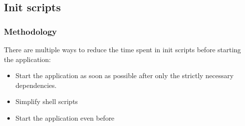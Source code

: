 \subsection{Init scripts}
\begin{frame}
\frametitle{Methodology}
There are multiple ways to reduce the time spent in init scripts before
starting the application:
\begin{itemize}
	\item Start the application as soon as possible after only the
              strictly necessary dependencies.
  	\item Simplify shell scripts
	\item Start the application even before 
\end{itemize}
\end{frame}

